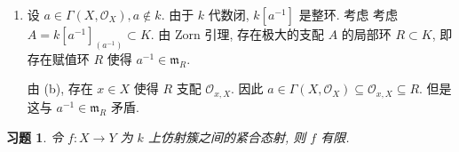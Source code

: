 \documentclass{article}
\theoremstyle{exercise}
\newtheorem{exercise}{习题}[section]
\theoremstyle{plain}
\theoremstyle{remark}
\newenvironment{proofc}{\proof}{\endproof}
\def\gm{\mathfrak{m}}
\def\cO{\mathscr{O}}
\begin{document}
\begin{proofc}
\begin{enumerate}[label=(\alph*)]
          设 $Z$ 是 $X$ 的不可约闭子概形, 考虑到基变换保持有限性和满射性,
          即知 $Z \times_X \tilde{X} \to Z$ 也是有限满射, 从而也满足引理条件.
          同时, 由于其紧合且 $Z$ 不可约, 一定存在 $Z \times_X \tilde{X}$ 的不可约分支 $Z'$
          使得 $Z' \to Z$ 亦是满射.
          为 $Z'$ 配备既约闭子概形结构, 则 $Z' \to Z$ 是紧合满射, 从而满足引理条件.
          由于 $Z \times_X \tilde{X}$ 也是 $\tilde{X}$ 的闭子概形 (习题 3.11),
          即知 $Z'$ 是 $\tilde{X}$ 的不可约闭子概形.

          因此问题归约为: 若 $X$ 是域 $k$ 上的有限型正规整概形,
          $Z$ 是其不可约闭子概形, $X$ 满足条件 (a) 或 (b),
          那么 $Z$ 也满足相同的条件. 通过归纳, 我们不妨假设 $Z$ 在 $X$ 中具有余维数 $1$.
          设 $Z$ 的一般点为 $z$, 则 $\cO_{z, X}$ 是一维整闭 Noether 局部整环,
          因此是离散赋值环.

          现在设 $S \subset K(Z) = k(z)$ 是赋值环, $k \subset S$.
          令 $\pi \colon \cO_{z, X} \to K(Z)$ 为商同态, $R = \pi^{-1}(S)$.
          则 $R$ 是 $K$ 中的赋值环: 任取 $u \in K$, 由于 $\cO_{z, X}$ 是离散赋值环,
          $u \in \cO_{z, X}$ 或 $u^{-1} \in \cO_{z, X}$.
          不妨设为前者. 若 $u \in \gm_z$, 则 $u \in R$;
          否则 $\pi(u)$ 或 $\pi(u^{-1})$ 其中之一属于 $S$, 因此 $u \in R$ 或者 $u^{-1} \in R$.
          综上, 对任意 $u \in K$, 必然有 $u \in R$ 或 $u^{-1} \in R$ 至少一条成立.
          因此 $R$ 是赋值环.

          设 $z' \in Z$ 是 $S$ 在 $Z$ 中的中心,
          则 $\cO_{z', X} = \pi^{-1}(\cO_{z', Z})$ 被 $R$ 支配, 从而 $z'$ 也是 $R$ 在 $X$ 里的中心.
          反之, 若 $z' \in X$ 是 $R$ 的中心,
          则 $\cO_{z', X} \subseteq R \subseteq \cO_{z, X}$, 因此 $z' \in Z$,
          且显然 $z'$ 也是 $Z$ 中 $S$ 的中心. 因此即证.
    \item 设 $a \in \Gamma(X, \cO_X), a \notin k$.
          由于 $k$ 代数闭, $k[a^{-1}]$ 是整环. 考虑
          考虑 $A = k[a^{-1}]_{(a^{-1})} \subset K$.
          由 Zorn 引理, 存在极大的支配 $A$ 的局部环 $R \subset K$,
          即存在赋值环 $R$ 使得 $a^{-1} \in \gm_R$.

          由 (b), 存在 $x \in X$ 使得 $R$ 支配 $\cO_{x, X}$.
          因此 $a \in \Gamma(X, \cO_X) \subseteq \cO_{x, X} \subseteq R$.
          但是这与 $a^{-1} \in \gm_R$ 矛盾. \qedhere
  \end{enumerate}
\end{proofc}

\begin{exercise}
  令 $f \colon X \to Y$ 为 $k$ 上仿射簇之间的紧合态射, 则 $f$ 有限.
\end{exercise}
\end{document}
